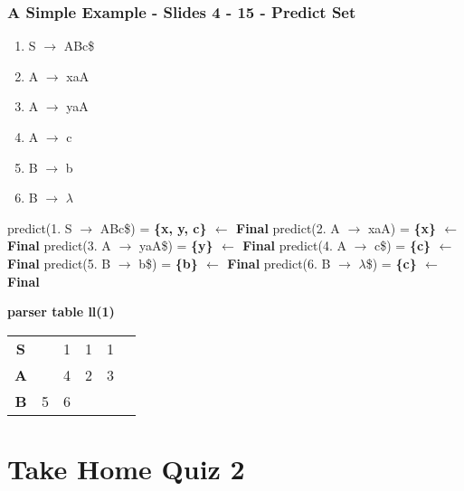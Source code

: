 \documentclass{report}
\begin{document}
\subsection{A Simple Example - Slides 4 - 15 - Predict Set}
\vspace{-1em}
\begin{multicols}{2}
  \begin{enumerate}
    \setlength\itemsep{-.25em}
    \item S $\rightarrow$ ABc\$
    \item A $\rightarrow$ xaA
    \item A $\rightarrow$ yaA
    \item A $\rightarrow$ c
    \item B $\rightarrow$ b
    \item B $\rightarrow$ $\lambda$\newline\newline
  \end{enumerate}
  \setlength{\leftskip}{-12em}
  predict(1. S $\rightarrow$ ABc\$) = \textbf{ \{x, y, c\} $\leftarrow$ Final}\newline
  predict(2. A $\rightarrow$ xaA) = \textbf{ \{x\} $\leftarrow$ Final}\newline
  predict(3. A $\rightarrow$ yaA\$) = \textbf{ \{y\} $\leftarrow$ Final}\newline
  predict(4. A $\rightarrow$ c\$) = \textbf{ \{c\} $\leftarrow$ Final}\newline
  predict(5. B $\rightarrow$ b\$) = \textbf{ \{b\} $\leftarrow$ Final}\newline
  predict(6. B $\rightarrow$ $\lambda$\$) = \textbf {\{c\} $\leftarrow$ Final}\newline
\end{multicols}
\vspace{-1em}
\noindent\textbf{parser table ll(1)}\newline
  \begin{tabular}{|c|c|c|c|c|c|}
    \hline
	  & \thead{b} & \thead{c} & \thead{x} & \thead{y} & \thead{\$}\\
    \hline
	\textbf{S} &   & 1 & 1 & 1 & \\
    \hline
	\textbf{A} &   & 4 & 2 & 3 & \\
    \hline
	\textbf{B} & 5 & 6 &   &   & \\
    \hline
  \end{tabular}

\newpage
\renewcommand\thechapter{Q2}
\chapter{Take Home Quiz 2}
\end{document}

